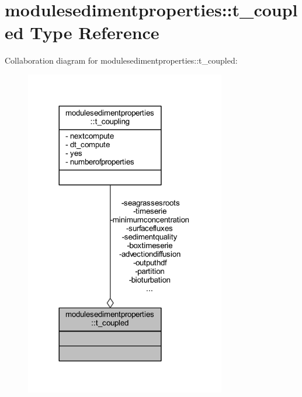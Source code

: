 \hypertarget{structmodulesedimentproperties_1_1t__coupled}{}\section{modulesedimentproperties\+:\+:t\+\_\+coupled Type Reference}
\label{structmodulesedimentproperties_1_1t__coupled}


Collaboration diagram for modulesedimentproperties\+:\+:t\+\_\+coupled\+:\nopagebreak
\begin{figure}[H]
\begin{center}
\leavevmode
\includegraphics[width=248pt]{structmodulesedimentproperties_1_1t__coupled__coll__graph}
\end{center}
\end{figure}
